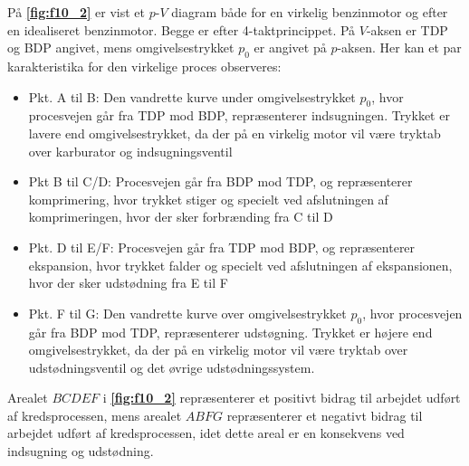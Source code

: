 På \textbf{\autoref{fig:f10_2}} er vist et $p$-$V$ diagram både for en virkelig benzinmotor og efter en idealiseret benzinmotor. Begge er efter 4-taktprincippet. På $V$-aksen er TDP og BDP angivet, mens omgivelsestrykket $p_0$ er angivet på $p$-aksen. Her kan et par karakteristika for den virkelige proces observeres:
\begin{itemize}
  \item Pkt. A til B: Den vandrette kurve under omgivelsestrykket $p_0$, hvor procesvejen går fra TDP mod BDP, repræsenterer indsugningen. Trykket er lavere end omgivelsestrykket, da der på en virkelig motor vil være tryktab over karburator og indsugningsventil
  \item Pkt B til C/D: Procesvejen går fra BDP mod TDP, og repræsenterer komprimering, hvor trykket stiger og specielt ved afslutningen af komprimeringen, hvor der sker forbrænding fra C til D
  \item Pkt. D til E/F: Procesvejen går fra TDP mod BDP, og repræsenterer ekspansion, hvor trykket falder og specielt ved afslutningen af ekspansionen, hvor der sker udstødning fra E til F
  \item Pkt. F til G: Den vandrette kurve over omgivelsestrykket $p_0$, hvor procesvejen går fra BDP mod TDP, repræsenterer udstøgning. Trykket er højere end omgivelsestrykket, da der på en virkelig motor vil være tryktab over udstødningsventil og det øvrige udstødningssystem. 
\end{itemize}

Arealet $BCDEF$ i \textbf{\autoref{fig:f10_2}} repræsenterer et positivt bidrag til arbejdet udført af kredsprocessen, mens arealet $ABFG$ repræsenterer et negativt bidrag til arbejdet udført af kredsprocessen, idet dette areal er en konsekvens ved indsugning og udstødning. 

